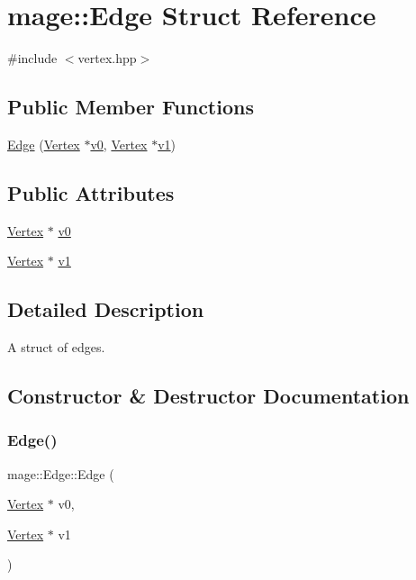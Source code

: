 \hypertarget{structmage_1_1_edge}{}\section{mage\+:\+:Edge Struct Reference}
\label{structmage_1_1_edge}


{\ttfamily \#include $<$vertex.\+hpp$>$}

\subsection*{Public Member Functions}
\begin{DoxyCompactItemize}
\item 
\hyperlink{structmage_1_1_edge_ae02d9b1c72160ca43f053b742d04fc32}{Edge} (\hyperlink{structmage_1_1_vertex}{Vertex} $\ast$\hyperlink{structmage_1_1_edge_a2558fb174f3d4cbf4b4732604236ec10}{v0}, \hyperlink{structmage_1_1_vertex}{Vertex} $\ast$\hyperlink{structmage_1_1_edge_a10072b2b5d8897431d0e4beb6eaf1ad1}{v1})
\end{DoxyCompactItemize}
\subsection*{Public Attributes}
\begin{DoxyCompactItemize}
\item 
\hyperlink{structmage_1_1_vertex}{Vertex} $\ast$ \hyperlink{structmage_1_1_edge_a2558fb174f3d4cbf4b4732604236ec10}{v0}
\item 
\hyperlink{structmage_1_1_vertex}{Vertex} $\ast$ \hyperlink{structmage_1_1_edge_a10072b2b5d8897431d0e4beb6eaf1ad1}{v1}
\end{DoxyCompactItemize}


\subsection{Detailed Description}
A struct of edges. 

\subsection{Constructor \& Destructor Documentation}
\hypertarget{structmage_1_1_edge_ae02d9b1c72160ca43f053b742d04fc32}{}\label{structmage_1_1_edge_ae02d9b1c72160ca43f053b742d04fc32} 
\subsubsection{\texorpdfstring{Edge()}{Edge()}}
{\footnotesize\ttfamily mage\+::\+Edge\+::\+Edge (\begin{DoxyParamCaption}\item[{\hyperlink{structmage_1_1_vertex}{Vertex} $\ast$}]{v0,  }\item[{\hyperlink{structmage_1_1_vertex}{Vertex} $\ast$}]{v1 }\end{DoxyParamCaption})}

